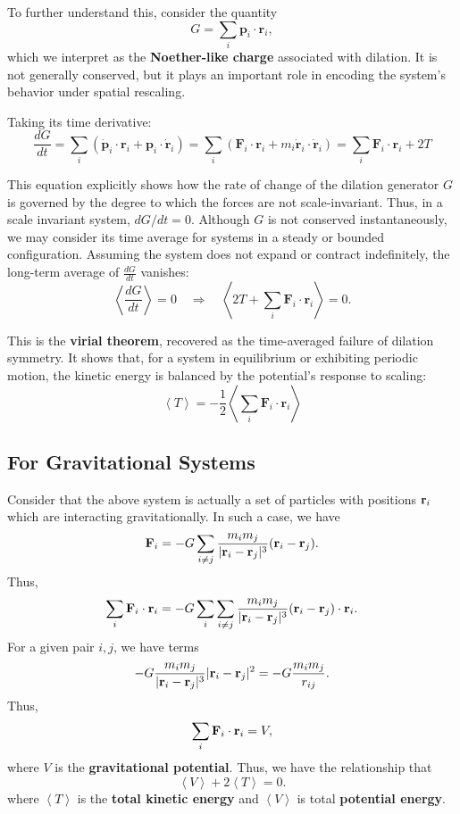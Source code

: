 To further understand this, consider the quantity
\[
G = \sum_i \mathbf{p}_i \cdot \mathbf{r}_i,
\]
which we interpret as the \textbf{Noether-like charge} associated with dilation. It is not generally conserved, but it plays an important role in encoding the system's behavior under spatial rescaling.

Taking its time derivative:
\[
\frac{dG}{dt} = \sum_i \left( \dot{\mathbf{p}}_i \cdot \mathbf{r}_i + \mathbf{p}_i \cdot \dot{\mathbf{r}}_i \right)
= \sum_i \left( \mathbf{F}_i \cdot \mathbf{r}_i + m_i \dot{\mathbf{r}}_i \cdot \dot{\mathbf{r}}_i \right)
= \sum_i \mathbf{F}_i \cdot \mathbf{r}_i + 2T
\]

This equation explicitly shows how the rate of change of the dilation generator $G$ is governed by the degree to which the forces are not scale-invariant. Thus, in a scale invariant system, $dG/dt = 0$.  Although $G$ is not conserved instantaneously, we may consider its time average for systems in a steady or bounded configuration. Assuming the system does not expand or contract indefinitely, the long-term average of $\frac{dG}{dt}$ vanishes:
\[
\left\langle \frac{dG}{dt} \right\rangle = 0
\quad \Rightarrow \quad
\left\langle 2T + \sum_i \mathbf{F}_i \cdot \mathbf{r}_i \right\rangle = 0.
\]

This is the \textbf{virial theorem}, recovered as the time-averaged failure of dilation symmetry. It shows that, for a system in equilibrium or exhibiting periodic motion, the kinetic energy is balanced by the potential's response to scaling:
\[
\boxed{
\left\langle T \right\rangle = -\frac{1}{2} \left\langle \sum_i \mathbf{F}_i \cdot \mathbf{r}_i \right\rangle
}
\]

\subsection{For Gravitational Systems}
Consider that the above system is actually a set of particles with positions ${\bf r}_i$ which are interacting gravitationally. In such a case, we have
\[
{\bf F}_i = -G\sum_{i\neq j}  \frac{m_im_j}{|{\bf r}_i-{\bf r}_j|^3} ({\bf r}_i-{\bf r}_j).
\]
Thus,
\[
\sum_i {\bf F}_i \cdot {\bf r}_i = -G \sum_{i}\sum_{i \neq j} \frac{m_im_j}{|{\bf r}_i-{\bf r}_j|^3  }({\bf r}_i- {\bf r}_j )\cdot {\bf r}_i.
\]
For a given pair $i,j$, we have terms
\[
- G \frac{m_im_j}{|{\bf r}_i-{\bf r}_j|^3} |{\bf r}_i-{\bf r}_j|^2 = - G \frac{m_im_j}{r_{ij}}.
\]
Thus,
\[
\sum_i {\bf F}_i \cdot {\bf r}_i = V,
\]
where $V$ is the \textbf{gravitational potential}. Thus, we have the relationship that
\[
\boxed{\left<V\right> + 2\left<T\right> = 0.}
\]
where $\left<T\right>$ is the \textbf{total kinetic energy} and $\left<V\right>$ is total \textbf{potential energy}.





